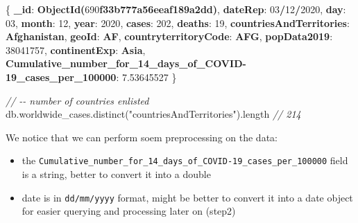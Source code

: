 \documentclass[
]{article}
\newenvironment{Shaded}{}{}
\newcommand{\AttributeTok}[1]{\textcolor[rgb]{0.49,0.56,0.16}{#1}}
\newcommand{\CommentTok}[1]{\textcolor[rgb]{0.38,0.63,0.69}{\textit{#1}}}
\newcommand{\DecValTok}[1]{\textcolor[rgb]{0.25,0.63,0.44}{#1}}
\newcommand{\ErrorTok}[1]{\textcolor[rgb]{1.00,0.00,0.00}{\textbf{#1}}}
\newcommand{\FloatTok}[1]{\textcolor[rgb]{0.25,0.63,0.44}{#1}}
\newcommand{\FunctionTok}[1]{\textcolor[rgb]{0.02,0.16,0.49}{#1}}
\newcommand{\NormalTok}[1]{#1}
\newcommand{\OperatorTok}[1]{\textcolor[rgb]{0.40,0.40,0.40}{#1}}
\newcommand{\StringTok}[1]{\textcolor[rgb]{0.25,0.44,0.63}{#1}}
\providecommand{\tightlist}{%
  \setlength{\itemsep}{0pt}\setlength{\parskip}{0pt}}
\begin{document}
\begin{Shaded}
\begin{Highlighting}[]
\FunctionTok{\{}
  \ErrorTok{\_id}\FunctionTok{:} \ErrorTok{ObjectId(\textquotesingle{}}\DecValTok{690}\ErrorTok{f33b777a56eeaf189a2dd\textquotesingle{})}\FunctionTok{,}
  \ErrorTok{dateRep}\FunctionTok{:} \ErrorTok{\textquotesingle{}}\DecValTok{03}\ErrorTok{/}\DecValTok{12}\ErrorTok{/}\DecValTok{2020}\ErrorTok{\textquotesingle{}}\FunctionTok{,}
  \ErrorTok{day}\FunctionTok{:} \ErrorTok{\textquotesingle{}}\DecValTok{03}\ErrorTok{\textquotesingle{}}\FunctionTok{,}
  \ErrorTok{month}\FunctionTok{:} \ErrorTok{\textquotesingle{}}\DecValTok{12}\ErrorTok{\textquotesingle{}}\FunctionTok{,}
  \ErrorTok{year}\FunctionTok{:} \ErrorTok{\textquotesingle{}}\DecValTok{2020}\ErrorTok{\textquotesingle{}}\FunctionTok{,}
  \ErrorTok{cases}\FunctionTok{:} \DecValTok{202}\FunctionTok{,}
  \ErrorTok{deaths}\FunctionTok{:} \DecValTok{19}\FunctionTok{,}
  \ErrorTok{countriesAndTerritories}\FunctionTok{:} \ErrorTok{\textquotesingle{}Afghanistan\textquotesingle{}}\FunctionTok{,}
  \ErrorTok{geoId}\FunctionTok{:} \ErrorTok{\textquotesingle{}AF\textquotesingle{}}\FunctionTok{,}
  \ErrorTok{countryterritoryCode}\FunctionTok{:} \ErrorTok{\textquotesingle{}AFG\textquotesingle{}}\FunctionTok{,}
  \ErrorTok{popData2019}\FunctionTok{:} \DecValTok{38041757}\FunctionTok{,}
  \ErrorTok{continentExp}\FunctionTok{:} \ErrorTok{\textquotesingle{}Asia\textquotesingle{}}\FunctionTok{,}
  \ErrorTok{\textquotesingle{}Cumulative\_number\_for\_14\_days\_of\_COVID{-}19\_cases\_per\_100000\textquotesingle{}}\FunctionTok{:} \ErrorTok{\textquotesingle{}}\FloatTok{7.53645527}\ErrorTok{\textquotesingle{}}
\FunctionTok{\}}
\end{Highlighting}
\end{Shaded}

\begin{Shaded}
\begin{Highlighting}[]
\CommentTok{// {-}{-} number of countries enlisted}
\NormalTok{db}\OperatorTok{.}\AttributeTok{worldwide\_cases}\OperatorTok{.}\FunctionTok{distinct}\NormalTok{(}\StringTok{"countriesAndTerritories"}\NormalTok{)}\OperatorTok{.}\AttributeTok{length}
\CommentTok{// 214}
\end{Highlighting}
\end{Shaded}

We notice that we can perform soem preprocessing on the data:

\begin{itemize}
\tightlist
\item
  the
  \texttt{Cumulative\_number\_for\_14\_days\_of\_COVID-19\_cases\_per\_100000}
  field is a string, better to convert it into a double
\item
  date is in \texttt{dd/mm/yyyy} format, might be better to convert it
  into a date object for easier querying and processing later on (step2)
\end{itemize}
\end{document}
